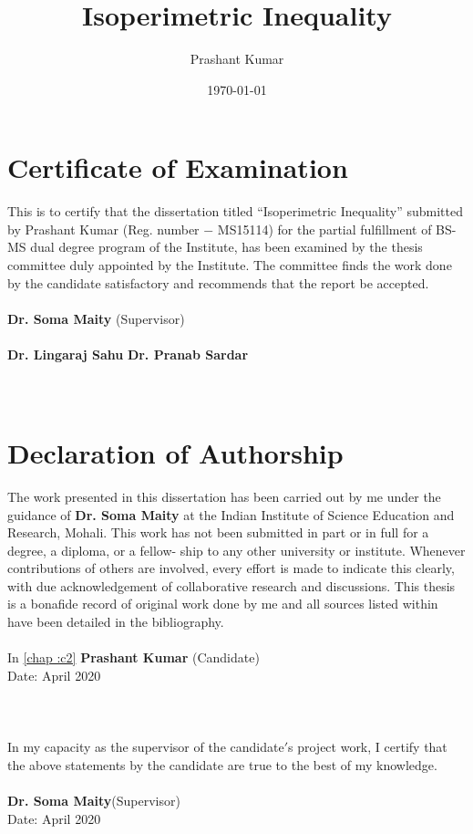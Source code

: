 \documentclass[oneside]{book}
\title{Isoperimetric Inequality}
\author{Prashant Kumar}
\date{\today}
\theoremstyle{definition}
\begin{document}
\maketitle
\hypersetup{
    linkcolor=blue,   %
     linktoc=all,     %
    linkcolor=blue,  %
    }
  
\tableofcontents
\thispagestyle{empty} 
\chapter*{Certificate of Examination} 
This is to certify that the dissertation titled \enquote{Isoperimetric Inequality} submitted by Prashant Kumar (Reg. number $-$ MS15114) for the partial fulfillment of BS-MS dual degree program of the Institute, has been examined by the thesis committee duly appointed by the Institute. The committee finds the work done by the candidate satisfactory and recommends that the report be accepted.\\\\
\textbf{Dr. Soma Maity} (Supervisor)\\
\\
 \textbf{Dr. Lingaraj Sahu}  \hfill           \textbf{ Dr. Pranab Sardar}\\
\\
\\
\thispagestyle{empty}
\chapter*{Declaration of Authorship}
The work presented in this dissertation has been carried out by me under the guidance of \textbf{Dr. Soma Maity} at the Indian Institute of Science Education and Research, Mohali.
This work has not been submitted in part or in full for a degree, a diploma, or a fellow- ship to any other university or institute. Whenever contributions of others are involved, every effort is made to indicate this clearly, with due acknowledgement of collaborative research and discussions. This thesis is a bonafide record of original work done by me and all sources listed within have been detailed in the bibliography.\\
\\  In \ref{chap :c2}
\textbf{Prashant Kumar} (Candidate)\\
Date: April 2020\\
\\
\\
\\
In my capacity as the supervisor of the candidate$'$s project work, I certify that the above statements by the candidate are true to the best of my knowledge.\\
\\
\textbf{Dr. Soma Maity}(Supervisor)\\
Date: April 2020
\thispagestyle{empty}
\end{document}
